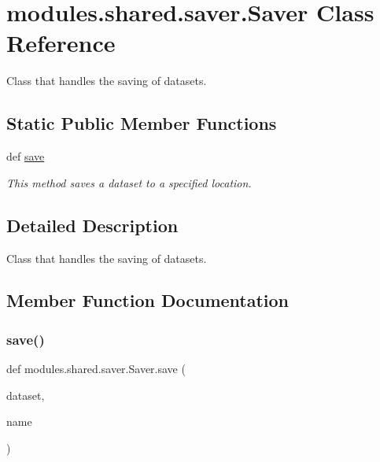 \hypertarget{classmodules_1_1shared_1_1saver_1_1_saver}{}\section{modules.\+shared.\+saver.\+Saver Class Reference}
\label{classmodules_1_1shared_1_1saver_1_1_saver}


Class that handles the saving of datasets.  


\subsection*{Static Public Member Functions}
\begin{DoxyCompactItemize}
\item 
def \mbox{\hyperlink{classmodules_1_1shared_1_1saver_1_1_saver_a56bd2d277b7f1184d3436738e8aff510}{save}}
\begin{DoxyCompactList}\small\item\em This method saves a dataset to a specified location. \end{DoxyCompactList}\end{DoxyCompactItemize}


\subsection{Detailed Description}
Class that handles the saving of datasets. 

\subsection{Member Function Documentation}
\mbox{\label{classmodules_1_1shared_1_1saver_1_1_saver_a56bd2d277b7f1184d3436738e8aff510}} 
\subsubsection{\texorpdfstring{save()}{save()}}
{\footnotesize\ttfamily def modules.\+shared.\+saver.\+Saver.\+save (\begin{DoxyParamCaption}\item[{}]{dataset,  }\item[{}]{name }\end{DoxyParamCaption})\hspace{0.3cm}{\ttfamily [static]}}



